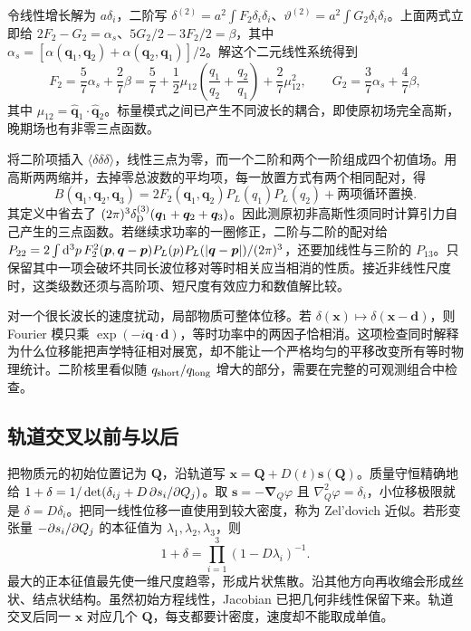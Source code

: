 令线性增长解为 $a\delta_i$，二阶写 $\delta^{(2)}=a^2\int F_2\delta_i\delta_i$、$\vartheta^{(2)}=a^2\int G_2\delta_i\delta_i$。上面两式立即给 $2F_2-G_2=\alpha_s$、$5G_2/2-3F_2/2=\beta$，其中 $\alpha_s=[\alpha(\bm q_1,\bm q_2)+\alpha(\bm q_2,\bm q_1)]/2$。解这个二元线性系统得到
\[
 F_2=\frac57\alpha_s+\frac27\beta
 =\frac57+\frac12\mu_{12}\left(\frac{q_1}{q_2}+\frac{q_2}{q_1}\right)
                         +\frac27\mu_{12}^2,\qquad
 G_2=\frac37\alpha_s+\frac47\beta ,
\]
其中 $\mu_{12}=\hat{\bm q}_1\cdot\hat{\bm q}_2$。标量模式之间已产生不同波长的耦合，即使原初场完全高斯，晚期场也有非零三点函数。

将二阶项插入 $\langle\delta\delta\delta\rangle$，线性三点为零，而一个二阶和两个一阶组成四个初值场。用高斯两两缩并，去掉零总波数的平均项，每一放置方式有两个相同配对，得
\[
 B(\bm q_1,\bm q_2,\bm q_3)
  =2F_2(\bm q_1,\bm q_2)P_L(q_1)P_L(q_2)+\text{两项循环置换}.
\]
其定义中省去了 $(2\pi)^3\delta_{\rm D}^{(3)}(\bm q_1+\bm q_2+\bm q_3)$。因此测原初非高斯性须同时计算引力自己产生的三点函数。若继续求功率的一圈修正，二阶与二阶的配对给 $P_{22}=2\int \dd^3p\,F_2^2(\bm p,\bm q-\bm p)P_L(p)P_L(|\bm q-\bm p|)/(2\pi)^3$，还要加线性与三阶的 $P_{13}$。只保留其中一项会破坏共同长波位移对等时相关应当相消的性质。接近非线性尺度时，这类级数还须与高阶项、短尺度有效应力和数值解比较。

对一个很长波长的速度扰动，局部物质可整体位移。若 $\delta(\bm x)\mapsto\delta(\bm x-\bm d)$，则 Fourier 模只乘 $\exp(-i\bm q\cdot\bm d)$，等时功率中的两因子恰相消。这项检查同时解释为什么位移能把声学特征相对展宽，却不能让一个严格均匀的平移改变所有等时物理统计。二阶核里看似随 $q_{\rm short}/q_{\rm long}$ 增大的部分，需要在完整的可观测组合中检查。

\subsection{轨道交叉以前与以后}

把物质元的初始位置记为 $\bm Q$，沿轨道写 $\bm x=\bm Q+D(t)\bm s(\bm Q)$。质量守恒精确地给 $1+\delta=1/\det(\delta_{ij}+D\,\partial s_i/\partial Q_j)$。取 $\bm s=-\bm\nabla_Q\varphi$ 且 $\nabla_Q^2\varphi=\delta_i$，小位移极限就是 $\delta=D\delta_i$。把同一线性位移一直使用到较大密度，称为 Zel'dovich 近似。若形变张量 $-\partial s_i/\partial Q_j$ 的本征值为 $\lambda_1,\lambda_2,\lambda_3$，则
\[
 1+\delta=\prod_{i=1}^3(1-D\lambda_i)^{-1}.
\]
最大的正本征值最先使一维尺度趋零，形成片状焦散。沿其他方向再收缩会形成丝状、结点状结构。虽然初始方程线性，Jacobian 已把几何非线性保留下来。轨道交叉后同一 $\bm x$ 对应几个 $\bm Q$，每支都要计密度，速度却不能取成单值。

